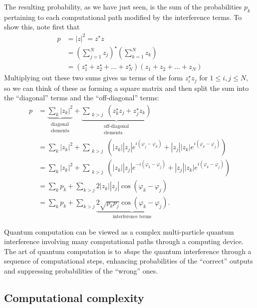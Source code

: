 \documentclass[fleqn,a4paper]{article}
\newenvironment{idea}{\everypar{\setlength{\parindent}{1.5em}}}{}
\theoremstyle{definition}
\theoremstyle{definition}
\theoremstyle{definition}
\theoremstyle{definition}
\theoremstyle{remark}
\begin{document}
The resulting probability, as we have just seen, is the sum of the probabilities \(p_k\) pertaining to each computational path modified by the interference terms.
To show this, note first that
\[
  \begin{aligned}
    p
    &= |z|^2 = z^\star z
  \\&= \left(  \sum_{j=1}^N z_j \right)^\star
       \left(  \sum_{k=1}^N z_k \right)
  \\&= \left( z_1^\star + z_2^\star + \dots + z_N^\star \right)
       \left( z_1 + z_2 + \dots + z_N \right)
  \end{aligned}
\]
Multiplying out these two sums gives us terms of the form \(z_i^\star z_j\) for \(1\leqslant i,j\leqslant N\), so we can think of these as forming a square matrix and then split the sum into the ``diagonal'' terms and the ``off-diagonal'' terms:
\[
  \begin{aligned}
    p
    &= \underbrace{\sum_k |z_k|^2}_{\substack{\text{diagonal}\\ \text{elements}}}
  + \underbrace{\sum_{\substack{ k > j}} \left( z_k^\star z_j + z_j^\star z_k\right)}_{\substack{\text{off-diagonal}\\ \text{elements}}}
  \\&= \sum_k |z_k|^2 + \sum_{\substack{ k > j}} \left( |z_k||z_j|
          e^{i(\varphi_j-\varphi_k)}
          + |z_j||z_k|
          e^{i(\varphi_k-\varphi_j)}
        \right)
  \\&= \sum_k |z_k|^2 + \sum_{\substack{ k > j}} \left( |z_k||z_j|
        e^{-i(\varphi_k-\varphi_j)}
        + |z_j||z_k|
        e^{i(\varphi_k-\varphi_j)}
      \right)
  \\&= \sum_k p_k + \sum_{k > j} 2 |z_k||z_j|\cos(\varphi_k-\varphi_j)
  \\&= \sum_k p_k + \sum_{k > j} \underbrace{2 \sqrt{p_k p_j}\cos(\varphi_k-\varphi_j)}_{\text{interference terms}}.
  \end{aligned}
\]

\begin{idea}
Quantum computation can be viewed as a complex multi-particle quantum interference involving many computational paths through a computing device.
The art of quantum computation is to \emph{shape} the quantum interference through a sequence of computational steps, enhancing probabilities of the ``correct'' outputs and suppressing probabilities of the ``wrong'' ones.

\end{idea}

\hypertarget{computational-complexity}{%
\subsection{Computational complexity}\label{computational-complexity}}
\end{document}
